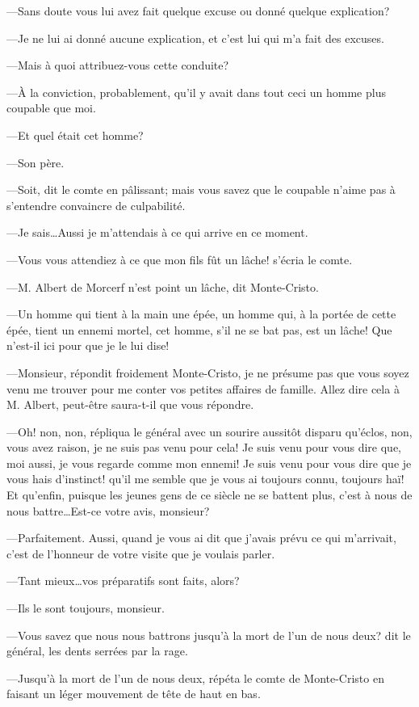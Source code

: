 —Sans doute vous lui avez fait quelque excuse ou donné quelque explication? 

—Je ne lui ai donné aucune explication, et c'est lui qui m'a fait des excuses. 

—Mais à quoi attribuez-vous cette conduite? 

—À la conviction, probablement, qu'il y avait dans tout ceci un homme plus coupable que moi. 

—Et quel était cet homme? 

—Son père. 

—Soit, dit le comte en pâlissant; mais vous savez que le coupable n'aime pas à s'entendre convaincre de culpabilité. 

—Je sais\dots Aussi je m'attendais à ce qui arrive en ce moment. 

—Vous vous attendiez à ce que mon fils fût un lâche! s'écria le comte. 

—M. Albert de Morcerf n'est point un lâche, dit Monte-Cristo. 

—Un homme qui tient à la main une épée, un homme qui, à la portée de cette épée, tient un ennemi mortel, cet homme, s'il ne se bat pas, est un lâche! Que n'est-il ici pour que je le lui dise! 

—Monsieur, répondit froidement Monte-Cristo, je ne présume pas que vous soyez venu me trouver pour me conter vos petites affaires de famille. Allez dire cela à M. Albert, peut-être saura-t-il que vous répondre. 

—Oh! non, non, répliqua le général avec un sourire aussitôt disparu qu'éclos, non, vous avez raison, je ne suis pas venu pour cela! Je suis venu pour vous dire que, moi aussi, je vous regarde comme mon ennemi! Je suis venu pour vous dire que je vous hais d'instinct! qu'il me semble que je vous ai toujours connu, toujours haï! Et qu'enfin, puisque les jeunes gens de ce siècle ne se battent plus, c'est à nous de nous battre\dots Est-ce votre avis, monsieur? 

—Parfaitement. Aussi, quand je vous ai dit que j'avais prévu ce qui m'arrivait, c'est de l'honneur de votre visite que je voulais parler. 

—Tant mieux\dots vos préparatifs sont faits, alors? 

—Ils le sont toujours, monsieur. 

—Vous savez que nous nous battrons jusqu'à la mort de l'un de nous deux? dit le général, les dents serrées par la rage. 

—Jusqu'à la mort de l'un de nous deux, répéta le comte de Monte-Cristo en faisant un léger mouvement de tête de haut en bas. 

